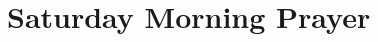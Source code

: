 \documentclass[12pt,twocolumn]{book}
\begin{document}
\section{Saturday Morning Prayer}









\end{document}
